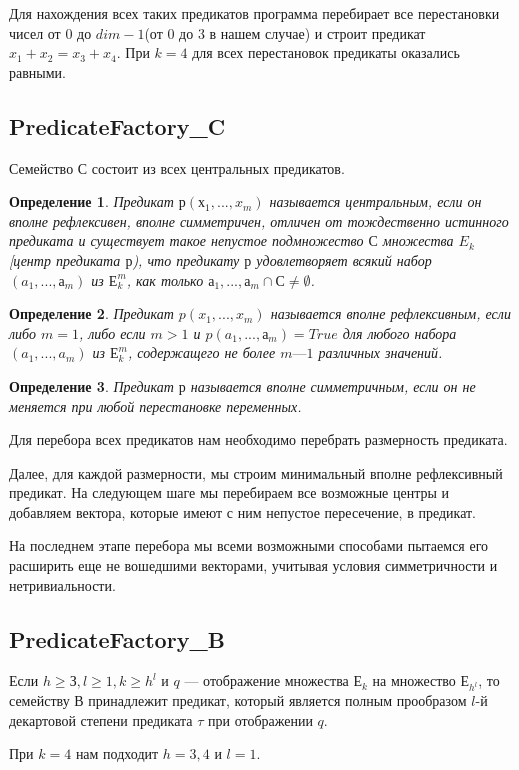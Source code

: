 \documentclass[a4paper,14pt]{extreport}
\newtheorem{opr}{Определение}
\begin{document}
Для нахождения всех таких предикатов программа перебирает все перестановки чисел от $0$ до $dim-1$(от $0$ до $3$ в нашем случае) и строит предикат $x_1+x_2=x_3+x_4$. При $k=4$ для всех перестановок предикаты оказались равными.
\subsection{PredicateFactory\_C}
Семейство $С$ состоит из всех центральных предикатов.

\begin{opr} Предикат $р(х_1,...,x_m )$ называется центральным, если он вполне рефлексивен, вполне симметричен, отличен от тождественно истинного предиката и существует такое непустое подмножество $С$ множества $E_k$ [центр предиката $р$),  что предикату $р$ удовлетворяет всякий набор $(a_1,..., а_m)$ из $Е_k^m$, как только ${а_1,..., а_m} \cap С \neq \emptyset$.
\end{opr}
\begin{opr}Предикат $p(x_1,..., x_m)$ называется вполне рефлексивным, если либо $m = 1$, либо  если $m > 1$ и $p(a_1,..., а_m) = True$ для любого набора $(a_1,...,a_m)$ из $Е_k^m$, содержащего не более $m — 1$ различных значений.
\end{opr}
\begin{opr} 
Предикат $р$ называется вполне симметричным, если он не меняется при любой перестановке переменных.  
\end{opr}

Для перебора всех предикатов нам необходимо перебрать размерность предиката.

Далее, для каждой размерности, мы строим минимальный вполне рефлексивный предикат.
На следующем шаге мы перебираем все возможные центры и добавляем вектора, которые имеют с ним непустое пересечение, в предикат.

На последнем этапе перебора мы  всеми возможными способами пытаемся его расширить еще не вошедшими векторами, учитывая условия симметричности и нетривиальности.
\subsection{PredicateFactory\_B}
Если $h \geqslant З, l \geqslant 1, k \geqslant h^l$ и $q$ — отображение множества $Е_k$ на  множество $Е_{h^l}$, то семейству $В$ принадлежит предикат, который является полным прообразом $l$-й декартовой степени предиката $\tau$ при отображении $q$.

При $k=4$ нам подходит $h=3,4$ и $l =1$.
\end{document}
